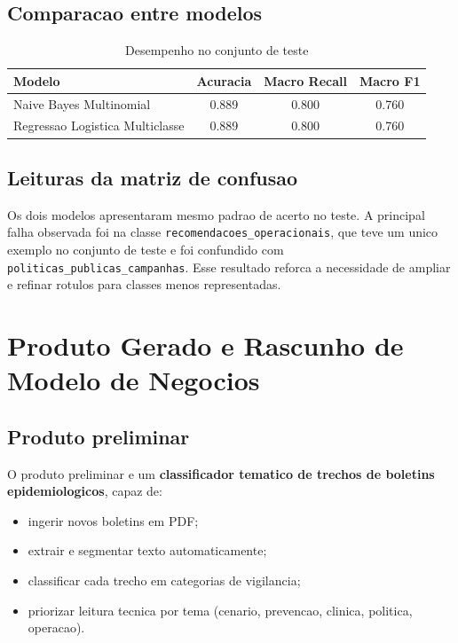 \documentclass[12pt,a4paper]{article}
\begin{document}
\subsection{Comparacao entre modelos}
\begin{table}[htbp]
\centering
\renewcommand{\arraystretch}{1.2}
\begin{tabularx}{\textwidth}{lccc}
\toprule
\textbf{Modelo} & \textbf{Acuracia} & \textbf{Macro Recall} & \textbf{Macro F1} \\
\midrule
Naive Bayes Multinomial & 0.889 & 0.800 & 0.760 \\
Regressao Logistica Multiclasse & 0.889 & 0.800 & 0.760 \\
\bottomrule
\end{tabularx}
\caption{Desempenho no conjunto de teste}
\end{table}

\subsection{Leituras da matriz de confusao}
Os dois modelos apresentaram mesmo padrao de acerto no teste. A principal falha observada foi na classe \texttt{recomendacoes\_operacionais}, que teve um unico exemplo no conjunto de teste e foi confundido com \texttt{politicas\_publicas\_campanhas}. Esse resultado reforca a necessidade de ampliar e refinar rotulos para classes menos representadas.

\section{Produto Gerado e Rascunho de Modelo de Negocios}
\subsection{Produto preliminar}
O produto preliminar e um \textbf{classificador tematico de trechos de boletins epidemiologicos}, capaz de:
\begin{itemize}[leftmargin=1.2cm]
    \item ingerir novos boletins em PDF;
    \item extrair e segmentar texto automaticamente;
    \item classificar cada trecho em categorias de vigilancia;
    \item priorizar leitura tecnica por tema (cenario, prevencao, clinica, politica, operacao).
\end{itemize}
\end{document}
